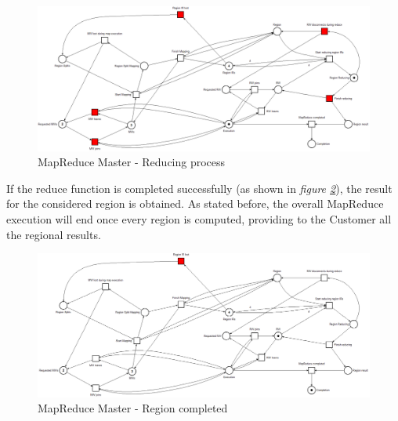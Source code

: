 \begin{figure}[!ht]
    \centering
    \includegraphics[width=\linewidth]{document/chapters/chapter_6/images/master_petri_net_4.png}
    \caption{MapReduce Master - Reducing process}
    \label{fig:master_petri_net_4}
\end{figure}

If the reduce function is completed successfully (as shown in \textit{figure \ref{fig:master_petri_net_5}}), the result for the considered region is obtained. As stated before, the overall MapReduce execution will end once every region is computed, providing to the Customer all the regional results. 

\begin{figure}[!ht]
    \centering
    \includegraphics[width=\linewidth]{document/chapters/chapter_6/images/master_petri_net_5.png}
    \caption{MapReduce Master - Region completed}
    \label{fig:master_petri_net_5}
\end{figure}